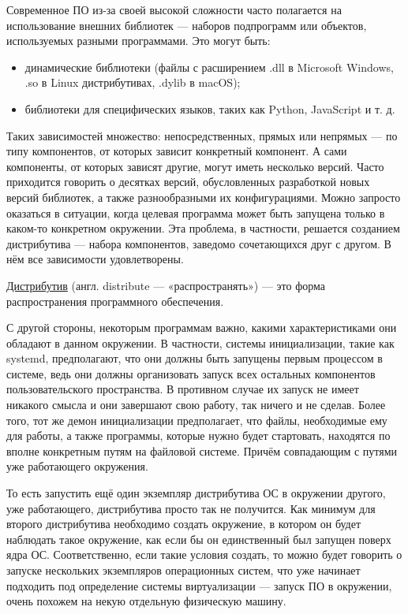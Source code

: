 \documentclass[14pt, a4paper]{article}
\begin{document}
Современное ПО из-за своей высокой сложности часто полагается на использование внешних
библиотек — наборов подпрограмм или объектов, используемых разными программами. Это могут
быть:

\begin{itemize}
    \item динамические библиотеки (файлы с расширением .dll в Microsoft Windows, .so в Linux
    дистрибутивах, .dylib в macOS);
    \item библиотеки для специфических языков, таких как Python, JavaScript и т. д.
\end{itemize}

Таких зависимостей множество: непосредственных, прямых или непрямых — по типу компонентов, от
которых зависит конкретный компонент. А сами компоненты, от которых зависят другие, могут иметь
несколько версий. Часто приходится говорить о десятках версий, обусловленных разработкой новых
версий библиотек, а также разнообразными их конфигурациями. Можно запросто оказаться в
ситуации, когда целевая программа может быть запущена только в каком-то конкретном окружении.
Эта проблема, в частности, решается созданием дистрибутива — набора компонентов, заведомо
сочетающихся друг с другом. В нём все зависимости удовлетворены.

\href{https://ru.wikipedia.org/wiki/%D0%94%D0%B8%D1%81%D1%82%D1%80%D0%B8%D0%B1%D1%83%D1%82%D0%B8%D0%B2}{Дистрибутив} (англ. distribute — «распространять») — это форма распространения программного
обеспечения.

С другой стороны, некоторым программам важно, какими характеристиками они обладают в данном
окружении. В частности, системы инициализации, такие как systemd, предполагают, что они должны
быть запущены первым процессом в системе, ведь они должны организовать запуск всех остальных
компонентов пользовательского пространства. В противном случае их запуск не имеет никакого
смысла и они завершают свою работу, так ничего и не сделав. Более того, тот же демон
инициализации предполагает, что файлы, необходимые ему для работы, а также программы, которые
нужно будет стартовать, находятся по вполне конкретным путям на файловой системе. Причём
совпадающим с путями уже работающего окружения.

То есть запустить ещё один экземпляр дистрибутива ОС в окружении другого, уже работающего,
дистрибутива просто так не получится. Как минимум для второго дистрибутива необходимо создать
окружение, в котором он будет наблюдать такое окружение, как если бы он единственный был
запущен поверх ядра ОС. Соответственно, если такие условия создать, то можно будет говорить о
запуске нескольких экземпляров операционных систем, что уже начинает подходить под определение
системы виртуализации — запуск ПО в окружении, очень похожем на некую отдельную физическую
машину.
\end{document}
